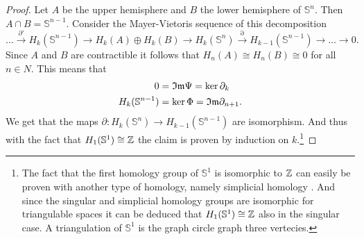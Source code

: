 \begin{proof}
  Let $A$ be the upper hemisphere and $B$ the lower hemisphere of $\mathbb{S}^n$. Then $A\cap B = \mathbb{S}^{n-1}$. Consider the Mayer-Vietoris sequence of this decomposition
  \begin{equation*}
    \ldots \overset{\partial'}{\to} H_k(\mathbb{S}^{n-1}) \to H_k(A) \oplus H_k(B) \to H_k(\mathbb{S}^n) \overset{\partial}{\to} H_{k-1}(\mathbb{S}^{n-1}) \to \ldots \to 0.
  \end{equation*}
  Since $A$ and $B$ are contractible it follows that $H_n(A) \cong H_n(B) \cong 0$ for all $n \in N$. This means that
  \begin{align*}
    0 &= \mathfrak{Im} \Psi = \ker \partial_k \\
    H_k(\mathbb{S}^{n-1}) &= \ker \Phi = \mathfrak{Im} \partial_{n+1}.
  \end{align*}
  We get that the maps $\partial\colon H_k(\mathbb{S}^n) \to H_{k-1}(\mathbb{S}^{n-1})$ are isomorphism. And thus with the fact that $H_1(\mathbb{S}^1) \cong \mathbb{Z}$ the claim is proven by induction on $k$.\footnote{The fact that the first homology group of $\mathbb{S}^1$ is isomorphic to $\mathbb{Z}$ can easily be proven with another type of homology, namely simplicial homology \cite[p. 106]{hatcher}. And since the singular and simplicial homology groups are isomorphic for triangulable spaces it can be deduced that $H_1(\mathbb{S}^1) \cong \mathbb{Z}$ also in the singular case. A triangulation of $\mathbb{S}^1$ is the graph circle graph three vertecies.}
\end{proof}
